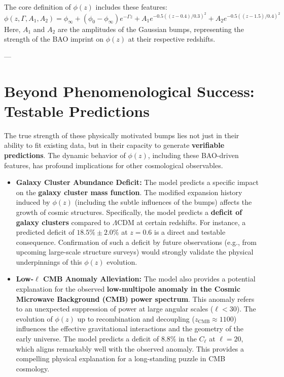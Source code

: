 \documentclass{article}
\begin{document}
The core definition of $\phi(z)$ includes these features:
$$\phi(z, \Gamma, A_1, A_2) = \phi_{\infty} + (\phi_0 - \phi_{\infty}) e^{-\Gamma z} + A_1 e^{-0.5((z - 0.4)/0.3)^2} + A_2 e^{-0.5((z - 1.5)/0.4)^2}$$
Here, $A_1$ and $A_2$ are the amplitudes of the Gaussian bumps, representing the strength of the BAO imprint on $\phi(z)$ at their respective redshifts.

---

\section{Beyond Phenomenological Success: Testable Predictions}

The true strength of these physically motivated bumps lies not just in their ability to fit existing data, but in their capacity to generate \textbf{verifiable predictions}. The dynamic behavior of $\phi(z)$, including these BAO-driven features, has profound implications for other cosmological observables.

\begin{itemize}
    \item \textbf{Galaxy Cluster Abundance Deficit:} The model predicts a specific impact on the \textbf{galaxy cluster mass function}. The modified expansion history induced by $\phi(z)$ (including the subtle influences of the bumps) affects the growth of cosmic structures. Specifically, the model predicts a \textbf{deficit of galaxy clusters} compared to $\Lambda$CDM at certain redshifts. For instance, a predicted deficit of $18.5\% \pm 2.0\%$ at $z=0.6$ is a direct and testable consequence. Confirmation of such a deficit by future observations (e.g., from upcoming large-scale structure surveys) would strongly validate the physical underpinnings of this $\phi(z)$ evolution.
    \item \textbf{Low-$\ell$ CMB Anomaly Alleviation:} The model also provides a potential explanation for the observed \textbf{low-multipole anomaly in the Cosmic Microwave Background (CMB) power spectrum}. This anomaly refers to an unexpected suppression of power at large angular scales ($\ell < 30$). The evolution of $\phi(z)$ up to recombination and decoupling ($z_{\text{CMB}} \approx 1100$) influences the effective gravitational interactions and the geometry of the early universe. The model predicts a deficit of $8.8\%$ in the $C_\ell$ at $\ell=20$, which aligns remarkably well with the observed anomaly. This provides a compelling physical explanation for a long-standing puzzle in CMB cosmology.
\end{itemize}
\end{document}
